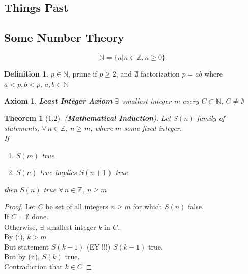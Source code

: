 \documentclass[twoside,landscape]{amsart}
\theoremstyle{plain}
\newtheorem{theorem}{Theorem}
\newtheorem{axiom}{Axiom}
\theoremstyle{definition}
\newtheorem{definition}{Definition}
\theoremstyle{remark}
\begin{document}
\begin{multicols*}{2}


\section{Things Past }

\subsection{Some Number Theory}

\[
\mathbb{N} = \lbrace n | n \in \mathbb{Z} , n \geq 0 \rbrace
\]

\begin{definition}
$p \in \mathbb{N}$, prime if $p\geq 2$, and $\nexists $ factorization $p=ab$ where $a<p, b<p$, $a,b\in \mathbb{N}$
\end{definition}



\begin{axiom} \textbf{Least Integer Axiom}
$\exists \, $ smallest integer in every $C \subset \mathbb{N}$, $C\neq \emptyset$
\end{axiom}



\begin{theorem}[1.2] (\textbf{Mathematical Induction}).  Let $S(n)$ family of statements, $\forall \, n \in \mathbb{Z}$, $n\geq m$, where $m$ some fixed integer.  \\
If \begin{enumerate}
\item[(i)] $S(m)$ true 
\item[(ii)] $S(n)$ true implies $S(n+1)$ true
\end{enumerate}
then $S(n)$ true $\forall \, n \in \mathbb{Z}$, $n\geq m$
\end{theorem}
\begin{proof} Let $C$ be set of all integers $n\geq m$ for which $S(n)$ false. \\
If $C =\emptyset$ done. \\
Otherwise, $\exists \, $ smallest integer $k$ in $C$. \\

By (i), $k > m$ \\
\phantom{\quad } But statement $S(k-1)$ (EY !!!)
\phantom{\quad \quad } $S(k-1)$ true. \\
But by (ii), $S(k)$ true.  \\
Contradiction that $k\in C$


\end{proof}
\end{multicols*}
\end{document}
